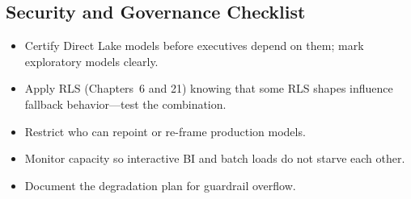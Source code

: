 \subsection{Security and Governance Checklist}
\begin{itemize}
    \item Certify Direct Lake models before executives depend on them; mark exploratory models clearly.
    \item Apply RLS (Chapters~6 and 21) knowing that some RLS shapes influence fallback behavior---test the combination.
    \item Restrict who can repoint or re-frame production models.
    \item Monitor capacity so interactive BI and batch loads do not starve each other.
    \item Document the degradation plan for guardrail overflow.
\end{itemize}

